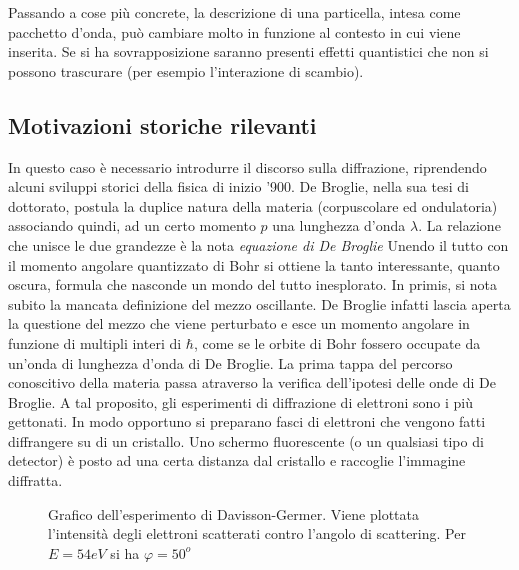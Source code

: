Passando a cose pi\`u concrete, la descrizione di una particella, intesa come pacchetto d'onda, può cambiare molto in funzione al contesto in cui viene inserita. Se si ha sovrapposizione saranno presenti effetti quantistici che non si possono trascurare (per esempio l'interazione di scambio).
\subsection{Motivazioni storiche rilevanti}
In questo caso è necessario introdurre il discorso sulla diffrazione, riprendendo alcuni sviluppi storici della fisica di inizio '900. De Broglie, nella sua tesi di dottorato, postula la duplice natura della materia (corpuscolare ed ondulatoria) associando quindi, ad un certo momento $p$ una lunghezza d'onda $\lambda$. La relazione che unisce le due grandezze è la nota \textit{equazione di De Broglie}
Unendo il tutto con il momento angolare quantizzato di Bohr si ottiene la tanto interessante, quanto oscura, formula
che nasconde un mondo del tutto inesplorato. In primis, si nota subito la mancata definizione del mezzo oscillante. De Broglie infatti lascia aperta la questione del mezzo che viene perturbato e esce un momento angolare in funzione di multipli interi di $\hbar$, come se le orbite di Bohr fossero occupate da un'onda di lunghezza d'onda di De Broglie. La prima tappa del percorso conoscitivo della materia passa atraverso la verifica dell'ipotesi delle onde di De Broglie. A tal proposito, gli esperimenti di diffrazione di elettroni sono i più gettonati. In modo opportuno si preparano fasci di elettroni che vengono fatti diffrangere su di un cristallo. Uno schermo fluorescente (o un qualsiasi tipo di detector) è posto ad una certa distanza dal cristallo e raccoglie l'immagine diffratta. 
\begin{figure}
	\centering
	\caption{Grafico dell'esperimento di Davisson-Germer. Viene plottata l'intensità degli elettroni scatterati contro l'angolo di scattering. Per $E=54eV$ si ha $\varphi=50^o$}
	\label{Davisson}
\end{figure}

